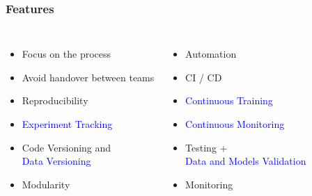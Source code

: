 \documentclass{beamer}
\begin{document}
\begin{frame}
\frametitle{Features}

\begin{columns}
    \begin{itemize}
        \item Focus on the process
        \item Avoid handover between teams
        \item Reproducibility
        \item \textcolor{blue}{Experiment Tracking}
        \item Code Versioning and \\ \textcolor{blue}{Data Versioning}
        \item Modularity
    \end{itemize}

    \begin{itemize} \pause
        \item Automation
        \item CI / CD
        \item \textcolor{blue}{Continuous Training}
        \item \textcolor{blue}{Continuous Monitoring}
        \item Testing + \\ \textcolor{blue}{Data and Models Validation}
        \item Monitoring
    \end{itemize}
\end{columns}



\end{frame}

\end{document}
